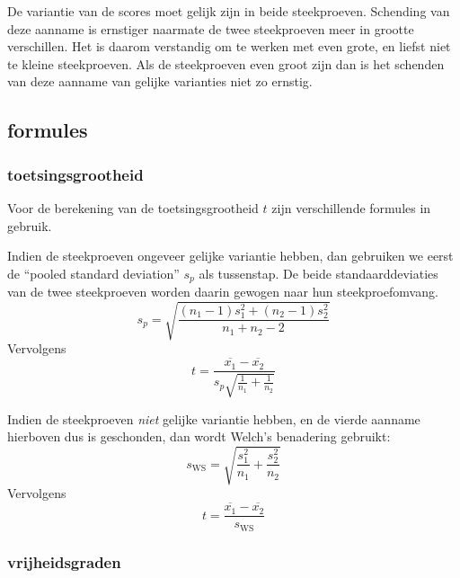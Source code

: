 \documentclass[
]{book}
\begin{document}
De variantie van de scores moet gelijk zijn in beide
steekproeven. Schending van deze aanname is ernstiger naarmate de twee
steekproeven meer in grootte verschillen. Het is daarom verstandig om te
werken met even grote, en liefst niet te kleine steekproeven. Als de
steekproeven even groot zijn dan is het schenden van deze aanname van
gelijke varianties niet zo ernstig.

\hypertarget{sec:ttoets-formules}{%
\subsection{formules}\label{sec:ttoets-formules}}

\hypertarget{toetsingsgrootheid}{%
\subsubsection{toetsingsgrootheid}\label{toetsingsgrootheid}}

Voor de berekening van de toetsingsgrootheid \(t\) zijn verschillende
formules in gebruik.

Indien de steekproeven ongeveer gelijke variantie hebben, dan gebruiken
we eerst de ``pooled standard deviation'' \(s_p\) als tussenstap. De beide
standaarddeviaties van de twee steekproeven worden daarin gewogen naar
hun steekproefomvang.
\begin{equation}
    s_p = \sqrt{ \frac{(n_1-1) s^2_1 + (n_2-1) s^2_2} {n_1+n_2-2} }
    \label{eq:sd-pooled}
\end{equation}
Vervolgens
\begin{equation}
  \label{eq:t-homoskedastic}
  t = \frac{ \overline{x_1}-\overline{x_2} } { s_p \sqrt{\frac{1}{n_1}+\frac{1}{n_2}} }
\end{equation}

Indien de steekproeven \emph{niet} gelijke variantie hebben, en de vierde
aanname hierboven dus is geschonden, dan wordt Welch's benadering
gebruikt:
\begin{equation}
  \label{eq:sd-WS}
  s_{\textrm{WS}} = \sqrt{\frac{s^2_1}{n_1}+\frac{s^2_2}{n_2} }
\end{equation}
Vervolgens
\begin{equation}
  \label{eq:t-WS}
  t = \frac{ \overline{x_1}-\overline{x_2} } { s_{\textrm{WS}} }
\end{equation}

\hypertarget{vrijheidsgraden}{%
\subsubsection{vrijheidsgraden}\label{vrijheidsgraden}}
\end{document}

